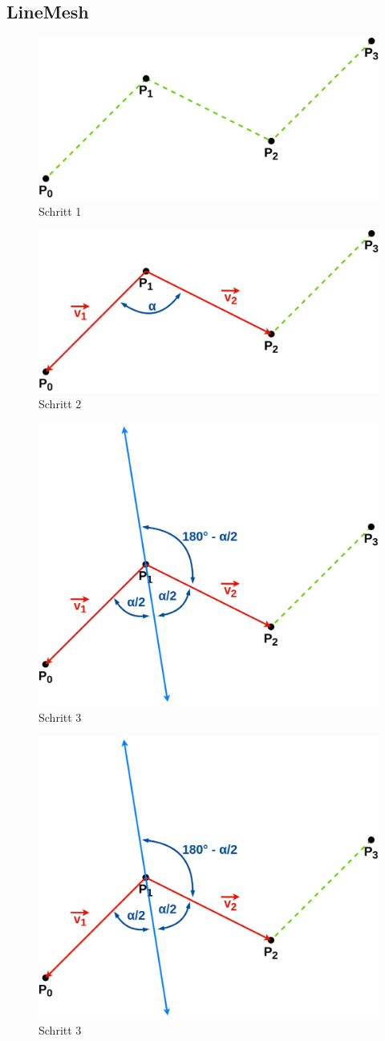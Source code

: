 \documentclass[doktyp=studarbeit]{TUBAFarbeiten}
\begin{document}
\subsection{LineMesh}
\begin{figure}[!h]
	\centering
	\includegraphics[width=0.5\linewidth]{Schlangenlinie-1.png}
	\caption{Schritt 1}
	\label{fig:line-1}
\end{figure}
\begin{figure}[!h]
	\centering
	\includegraphics[width=0.5\linewidth]{Schlangenlinie-2.png}
	\caption{Schritt 2}
	\label{fig:line-2}
\end{figure}
\begin{figure}[!h]
	\centering
	\includegraphics[width=0.5\linewidth]{Schlangenlinie-3.png}
	\caption{Schritt 3}
	\label{fig:line-3}
\end{figure}
\begin{figure}[!h]
	\centering
	\includegraphics[width=0.5\linewidth]{Schlangenlinie-3.png}
	\caption{Schritt 3}
	\label{fig:line-3}
\end{figure}
\end{document}
